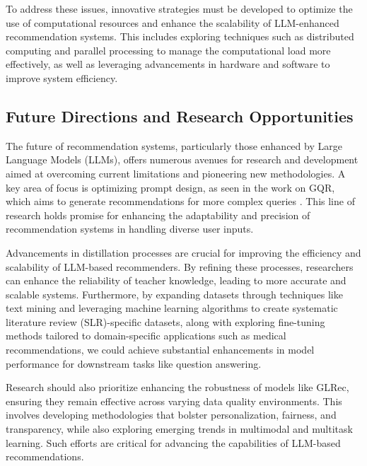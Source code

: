 To address these issues, innovative strategies must be developed to optimize the use of computational resources and enhance the scalability of LLM-enhanced recommendation systems. This includes exploring techniques such as distributed computing and parallel processing to manage the computational load more effectively, as well as leveraging advancements in hardware and software to improve system efficiency.





\subsection{Future Directions and Research Opportunities} \label{subsec:Future Directions and Research Opportunities}



The future of recommendation systems, particularly those enhanced by Large Language Models (LLMs), offers numerous avenues for research and development aimed at overcoming current limitations and pioneering new methodologies. A key area of focus is optimizing prompt design, as seen in the work on GQR, which aims to generate recommendations for more complex queries \cite{bacciu2024generatingqueryrecommendationsllms}. This line of research holds promise for enhancing the adaptability and precision of recommendation systems in handling diverse user inputs.



Advancements in distillation processes are crucial for improving the efficiency and scalability of LLM-based recommenders. By refining these processes, researchers can enhance the reliability of teacher knowledge, leading to more accurate and scalable systems. Furthermore, by expanding datasets through techniques like text mining and leveraging machine learning algorithms to create systematic literature review (SLR)-specific datasets, along with exploring fine-tuning methods tailored to domain-specific applications such as medical recommendations, we could achieve substantial enhancements in model performance for downstream tasks like question answering. \cite{susnjak2024automatingresearchsynthesisdomainspecific}



Research should also prioritize enhancing the robustness of models like GLRec, ensuring they remain effective across varying data quality environments. This involves developing methodologies that bolster personalization, fairness, and transparency, while also exploring emerging trends in multimodal and multitask learning. Such efforts are critical for advancing the capabilities of LLM-based recommendations.



